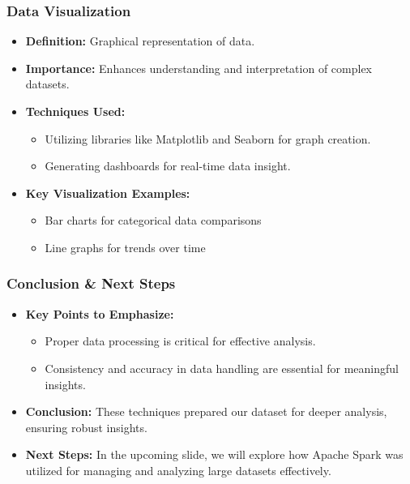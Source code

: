\documentclass[aspectratio=169]{beamer}
\begin{document}
\begin{frame}[fragile]
    \frametitle{Data Visualization}
    \begin{itemize}
        \item \textbf{Definition:} Graphical representation of data.
        \item \textbf{Importance:} Enhances understanding and interpretation of complex datasets.
        \item \textbf{Techniques Used:}
        \begin{itemize}
            \item Utilizing libraries like Matplotlib and Seaborn for graph creation.
            \item Generating dashboards for real-time data insight.
        \end{itemize}
        \item \textbf{Key Visualization Examples:}
        \begin{itemize}
            \item Bar charts for categorical data comparisons
            \item Line graphs for trends over time
        \end{itemize}
    \end{itemize}
\end{frame}

\begin{frame}[fragile]
    \frametitle{Conclusion \& Next Steps}
    \begin{itemize}
        \item \textbf{Key Points to Emphasize:}
        \begin{itemize}
            \item Proper data processing is critical for effective analysis.
            \item Consistency and accuracy in data handling are essential for meaningful insights.
        \end{itemize}
        \item \textbf{Conclusion:} These techniques prepared our dataset for deeper analysis, ensuring robust insights.
        \item \textbf{Next Steps:} In the upcoming slide, we will explore how Apache Spark was utilized for managing and analyzing large datasets effectively.
    \end{itemize}
\end{frame}
\end{document}
